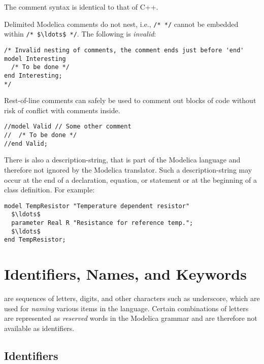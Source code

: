 \begin{nonnormative}
The comment syntax is identical to that of C++.
\end{nonnormative}

Delimited Modelica comments do not nest, i.e., \lstinline!/* */! cannot be embedded within \lstinline!/* $\ldots$ */!.
The following is \emph{invalid}:
\begin{lstlisting}[language=modelica]
/* Invalid nesting of comments, the comment ends just before 'end'
model Interesting
  /* To be done */
end Interesting;
*/
\end{lstlisting}
Rest-of-line comments can safely be used to comment out blocks of code without risk of conflict with comments inside.
\begin{lstlisting}[language=modelica]
//model Valid // Some other comment
//  /* To be done */
//end Valid;
\end{lstlisting}

There is also a description-string, that is part of the Modelica language and therefore not ignored by the Modelica translator.
Such a description-string may occur at the end of a declaration, equation, or statement or at the beginning of a class definition.
For example:
\begin{lstlisting}[language=modelica]
model TempResistor "Temperature dependent resistor"
  $\ldots$
  parameter Real R "Resistance for reference temp.";
  $\ldots$
end TempResistor;
\end{lstlisting}


\section{Identifiers, Names, and Keywords}\label{identifiers-names-and-keywords}

 are sequences of letters, digits, and other characters such as underscore, which are used for \emph{naming} various items in the language.
Certain combinations of letters are  represented as \emph{reserved} words in the Modelica grammar and are therefore not available as identifiers.


\subsection{Identifiers}\label{identifiers}


